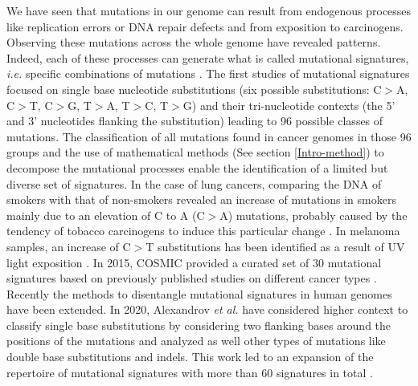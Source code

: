 We have seen that mutations in our genome can result from endogenous processes like replication errors or \gls*{DNA} repair defects and from exposition to carcinogens. Observing these mutations across the whole genome have revealed patterns. Indeed, each of these processes can generate what is called mutational signatures, \textit{i.e.} specific combinations of mutations \cite{Alexandrov2013}. %
The first studies of mutational signatures focused on single base nucleotide substitutions (six possible substitutions: C$>$A, C$>$T, C$>$G,  T$>$A, T$>$C, T$>$G) and their tri-nucleotide contexts (the 5' and 3' nucleotides flanking the substitution) leading to 96 possible classes of mutations. The classification of all mutations found in cancer genomes in those 96 groups and the use of mathematical methods (See section \ref{Intro-method}) to decompose the mutational processes enable the identification of a limited but diverse set of signatures. In the case of lung cancers, comparing the DNA of smokers with that of non-smokers revealed an increase of mutations in smokers mainly due to an elevation of C to A (C$>$A) mutations, probably caused by the tendency of tobacco carcinogens to induce this particular change \cite{Nik-Zainal2015}. In melanoma samples, an increase of C$>$T substitutions has been identified as a result of \gls{UV} light exposition \cite{Alexandrov2014}. 
In 2015, COSMIC provided a curated set of 30 mutational signatures based on previously published studies on different cancer types \cite{Cosmic_2015}. Recently the methods to disentangle mutational signatures in human genomes have been extended. In 2020, Alexandrov \textit{et al.} have considered higher context to classify single base substitutions by considering two flanking bases around the positions of the mutations and analyzed as well other types of mutations like double base substitutions and \gls{indels}. This work led to an expansion of the repertoire of mutational signatures with more than 60 signatures in total \cite{Alexandrov2020}. %

